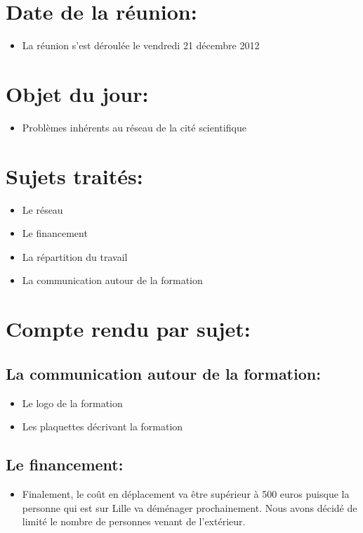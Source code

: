 \section{Date de la réunion:}
\begin{itemize}
\item La réunion s'est déroulée le vendredi 21 décembre 2012
\end{itemize}

\section{Objet du jour:}
\begin{itemize}
\item Problèmes inhérents au réseau de la cité scientifique
\end{itemize}

\section{Sujets traités:}
\begin{itemize}
\item Le réseau
\item Le financement
\item La répartition du travail
\item La communication autour de la formation
\end{itemize}

\section{Compte rendu par sujet:}

\subsection{La communication autour de la formation:}
\begin{itemize}
\item Le logo de la formation
\item Les plaquettes décrivant la formation

\end{itemize}

\subsection{Le financement:}
\begin{itemize}
\item Finalement, le coût en déplacement va être supérieur à 500 euros
puisque la personne qui est sur Lille va déménager prochainement. Nous
avons décidé de limité le nombre de personnes venant de l'extérieur.
\end{itemize}

